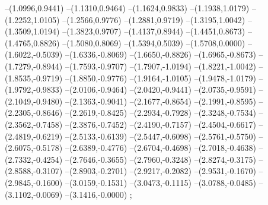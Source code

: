 {--(1.0996,0.9441)
--(1.1310,0.9464)
--(1.1624,0.9833)
--(1.1938,1.0179)
--(1.2252,1.0105)
--(1.2566,0.9776)
--(1.2881,0.9719)
--(1.3195,1.0042)
--(1.3509,1.0194)
--(1.3823,0.9707)
--(1.4137,0.8944)
--(1.4451,0.8673)
--(1.4765,0.8826)
--(1.5080,0.8069)
--(1.5394,0.5039)
--(1.5708,0.0000)
--(1.6022,-0.5039)
--(1.6336,-0.8069)
--(1.6650,-0.8826)
--(1.6965,-0.8673)
--(1.7279,-0.8944)
--(1.7593,-0.9707)
--(1.7907,-1.0194)
--(1.8221,-1.0042)
--(1.8535,-0.9719)
--(1.8850,-0.9776)
--(1.9164,-1.0105)
--(1.9478,-1.0179)
--(1.9792,-0.9833)
--(2.0106,-0.9464)
--(2.0420,-0.9441)
--(2.0735,-0.9591)
--(2.1049,-0.9480)
--(2.1363,-0.9041)
--(2.1677,-0.8654)
--(2.1991,-0.8595)
--(2.2305,-0.8646)
--(2.2619,-0.8425)
--(2.2934,-0.7928)
--(2.3248,-0.7534)
--(2.3562,-0.7458)
--(2.3876,-0.7452)
--(2.4190,-0.7157)
--(2.4504,-0.6617)
--(2.4819,-0.6219)
--(2.5133,-0.6139)
--(2.5447,-0.6098)
--(2.5761,-0.5750)
--(2.6075,-0.5178)
--(2.6389,-0.4776)
--(2.6704,-0.4698)
--(2.7018,-0.4638)
--(2.7332,-0.4254)
--(2.7646,-0.3655)
--(2.7960,-0.3248)
--(2.8274,-0.3175)
--(2.8588,-0.3107)
--(2.8903,-0.2701)
--(2.9217,-0.2082)
--(2.9531,-0.1670)
--(2.9845,-0.1600)
--(3.0159,-0.1531)
--(3.0473,-0.1115)
--(3.0788,-0.0485)
--(3.1102,-0.0069)
--(3.1416,-0.0000)
;}
